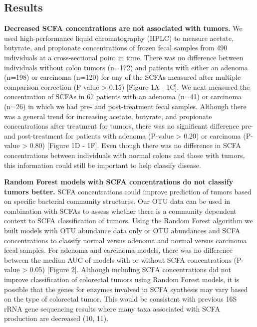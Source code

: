 \documentclass[11pt,]{article}
\begin{document}
\newpage

\subsection{Results}\label{results}

\textbf{Decreased SCFA concentrations are not associated with tumors.}
We used high-performance liquid chromatography (HPLC) to measure
acetate, butyrate, and propionate concentrations of frozen fecal samples
from 490 individuals at a cross-sectional point in time. There was no
difference between individuals without colon tumors (n=172) and patients
with either an adenoma (n=198) or carcinoma (n=120) for any of the SCFAs
measured after multiple comparison correction (P-value \textgreater{}
0.15) {[}Figure 1A - 1C{]}. We next measured the concentration of SCFAs
in 67 patients with an adenoma (n=41) or carcinoma (n=26) in which we
had pre- and post-treatment fecal samples. Although there was a general
trend for increasing acetate, butyrate, and propionate concentrations
after treatment for tumors, there was no significant difference pre- and
post-treatment for patients with adenoma (P-value \textgreater{} 0.20)
or carcinoma (P-value \textgreater{} 0.80) {[}Figure 1D - 1F{]}. Even
though there was no difference in SCFA concentrations between
individuals with normal colons and those with tumors, this information
could still be important to help classify disease.

\textbf{Random Forest models with SCFA concentrations do not classify
tumors better.} SCFA concentrations could improve prediction of tumors
based on specific bacterial community structures. Our OTU data can be
used in combination with SCFAs to assess whether there is a community
dependent context to SCFA classification of tumors. Using the Random
Forest algorithm we built models with OTU abundance data only or OTU
abundances and SCFA concentrations to classify normal versus adenoma and
normal versus carcinoma fecal samples. For adenoma and carcinoma models,
there was no difference between the median AUC of models with or without
SCFA concentrations (P-value \textgreater{} 0.05) {[}Figure 2{]}.
Although including SCFA concentrations did not improve classification of
colorectal tumors using Random Forest models, it is possible that the
genes for enzymes involved in SCFA synthesis may vary based on the type
of colorectal tumor. This would be consistent with previous 16S rRNA
gene sequencing results where many taxa associated with SCFA production
are decreased (10, 11).
\end{document}
